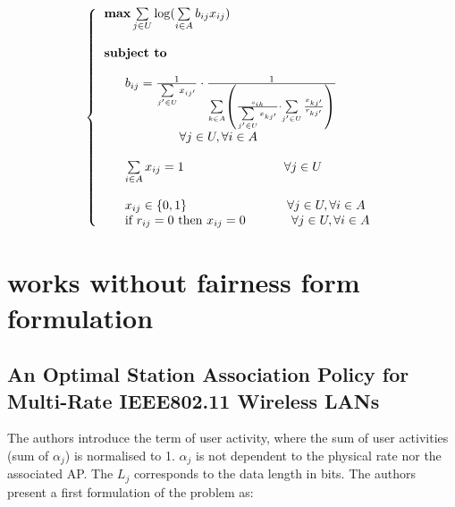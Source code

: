 \documentclass[journal,transmag]{IEEEtran}
\begin{document}
\begin{footnotesize}
\begin{equation}
\left\{
\begin{tabular}{l} 
$\textbf{max}  \sum\limits_{j \in U} \log (\sum\limits_{i \in A} b_{ij} x_{ij}) $ \\         
\\
\textbf{subject to} \\

\\
~~~~~$ b_{ij}= \frac{1}{\sum\limits_{j' \in U} x_{ij'}} \cdot \frac{1}{\sum\limits_{k \in A} \left (\frac{s_{ik}}{\sum\limits_{j' \in U} x_{kj'}} \cdot \sum\limits_{j' \in U} \frac{x_{kj'}}{r_{kj'}}\right )} $ \\~~~~~~~~~~~~~~~~~ $\forall j \in U,  \forall i \in A $  \\

\\
~~~~~$ \sum\limits_{i \in A} x_{ij} = 1 $ ~~~~~~~~~~~~~~~~~~~~~~ $\forall j \in U $  \\

\\
~~~~~$ x_{ij} \in \{0,1 \} $ ~~~~~~~~~~~~~~~~~~~~~~ $\forall j \in U,  \forall i \in A $  \\

~~~~~if $r_{ij}=0$ then $x_{ij}=0$  ~~~~~~~~~ $\forall j \in U,  \forall i \in A $  \\


\end{tabular}
\right.
\end{equation}
\end{footnotesize}

\section{works without fairness form formulation}
\subsection{An Optimal Station Association Policy for Multi-Rate IEEE802.11 Wireless LANs \cite{07optimal_association_MSWIM}} 
The authors introduce the term of user activity, where the sum of user activities (sum of $\alpha_j$) is normalised to 1. $\alpha_j$ is not dependent to the physical rate nor the associated AP. The $L_j$ corresponds to the data length in bits. The authors present a first formulation of the problem as: \\ 
\end{document}
